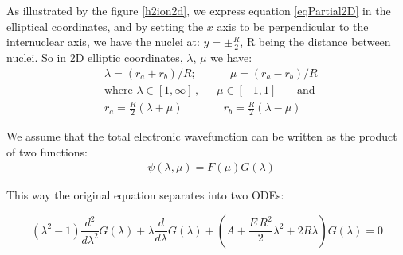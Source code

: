 As illustrated by the figure  \ref{h2ion2d}, we express equation \eqref{eqPartial2D} in the elliptical coordinates, and by setting the $ x $ axis to be perpendicular to the internuclear axis, we have the nuclei at: $ y = \pm \frac{R}{2}  $, R being the distance between nuclei. So in  2D elliptic coordinates, $ \lambda $, $ \mu $ we have:
\begin{equation}\label{variables1}
\begin{split}
& \lambda = \left(r_a + r_b\right)/R;\,\,\,\,\,\,\,\,\,\,\,\,\,\,\,\,\,\,\mu =  \left(r_a - r_b\right)/R  \\[1em]
& \text{where } \lambda \in \left[1,\infty\right]\,,\,\,\,\,\,\,\,\,\,\mu \in \left[ -1, 1 \right]\,\,\,\,\,\,\,\,\,\text{ and } \\[.8em] 
& r_a = \frac{R}{2}\left(\lambda + \mu \right)\,\,\,\,\,\,\,\,\,\,\,\,\,\,\,\,\,\,\,\,\,\, r_b = \frac{R}{2}\left(\lambda - \mu \right)
\end{split}
\end{equation}

We assume that the total electronic wavefunction can be written as the product of two functions:
\begin{equation}\label{variables2}
\begin{split}
& \psi(\lambda,\mu) = F(\mu)G(\lambda)
\end{split}
\end{equation}

This way the original equation separates into two ODEs:

\begin{equation}\label{L2-1}
\left(\lambda^2 - 1 \right) \frac{d^2}{ d\lambda^2 }G(\lambda) + \lambda\frac{ d}{d\lambda }G (\lambda)  + \left(A + \frac{E\,R^2}{2}\lambda^2 + 2R\lambda  \right)G (\lambda) = 0  
\end{equation}

